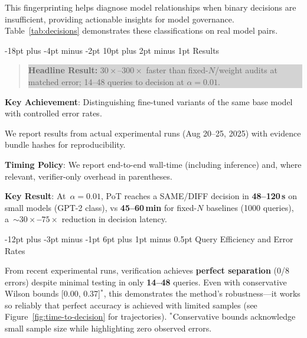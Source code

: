 \documentclass[11pt]{article}
\makeatletter
\renewcommand\section{\@startsection{section}{1}{\z@}%
  {-18pt plus -4pt minus -2pt}%
  {10pt plus 2pt minus 1pt}%
  {\normalfont\Large\bfseries}}
\renewcommand\subsection{\@startsection{subsection}{2}{\z@}%
  {-12pt plus -3pt minus -1pt}%
  {6pt plus 1pt minus 0.5pt}%
  {\normalfont\large\bfseries}}
\makeatother
\begin{document}
This fingerprinting helps diagnose model relationships when binary decisions are insufficient, providing actionable insights for model governance. Table~\ref{tab:decisions} demonstrates these classifications on real model pairs.

\section{Results}
\label{sec:results}

\begin{quote}
\colorbox{lightgray}{\parbox{0.95\textwidth}{\textbf{Headline Result:} $30{\times}$--$300{\times}$ faster than fixed-$N$/weight audits at matched error; 14--48 queries to decision at $\alpha=0.01$.}}
\end{quote}

\noindent\textbf{Key Achievement}: Distinguishing fine-tuned variants of the same base model with controlled error rates.

We report results from actual experimental runs (Aug 20--25, 2025) with evidence bundle hashes for reproducibility.

\textbf{Timing Policy}: We report end-to-end wall-time (including inference) and, where relevant, verifier-only overhead in parentheses.

\textbf{Key Result}: At~$\alpha = 0.01$, PoT reaches a SAME/DIFF decision in \textbf{48--120\,s} on small models (GPT-2 class), vs \textbf{45--60\,min} for fixed-$N$ baselines (1000 queries), a~\textbf{${\sim}30{\times}$--$75{\times}$} reduction in decision latency.

\subsection{Query Efficiency and Error Rates}

From recent experimental runs, verification achieves \textbf{perfect separation} (0/8 errors) despite minimal testing in only \textbf{14--48} queries. Even with conservative Wilson bounds [0.00, 0.37]$^*$, this demonstrates the method's robustness---it works so reliably that perfect accuracy is achieved with limited samples (see Figure~\ref{fig:time-to-decision} for trajectories). {\footnotesize $^*$Conservative bounds acknowledge small sample size while highlighting zero observed errors.}
\end{document}
